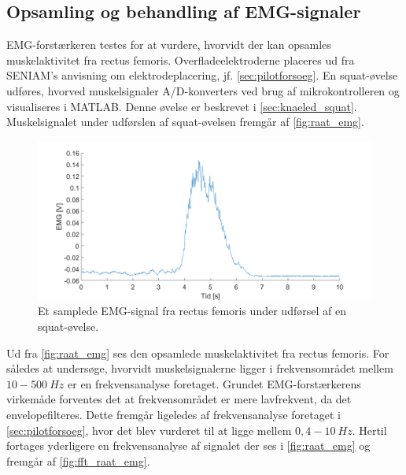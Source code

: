 \subsection{Opsamling og behandling af EMG-signaler}

EMG-forstærkeren testes for at vurdere, hvorvidt der kan opsamles muskelaktivitet fra rectus femoris. Overfladeelektroderne placeres ud fra SENIAM's anvisning om elektrodeplacering, jf. \autoref{sec:pilotforsoeg}. En squat-øvelse udføres, hvorved muskelsignaler A/D-konverters ved brug af mikrokontrolleren og visualiseres i MATLAB. Denne øvelse er beskrevet i \autoref{sec:knaeled_squat}. Muskelsignalet under udførslen af squat-øvelsen fremgår af \autoref{fig:raat_emg}. 

\begin{figure}[H]
\centering
\includegraphics[width=1\textwidth]{figures/raat_EMG_test}
\caption{Et samplede EMG-signal fra rectus femoris under udførsel af en squat-øvelse.}
\label{fig:raat_emg}
\end{figure}

\noindent
Ud fra \autoref{fig:raat_emg} ses den opsamlede muskelaktivitet fra rectus femoris. For således at undersøge, hvorvidt muskelsignalerne ligger i frekvensområdet mellem $10-500~Hz$ er en frekvensanalyse foretaget. Grundet EMG-forstærkerens virkemåde forventes det at frekvensområdet er mere lavfrekvent, da det envelopefilteres. Dette fremgår ligeledes af frekvensanalyse foretaget i \autoref{sec:pilotforsoeg}, hvor det blev vurderet til at ligge  mellem $0,4-10~Hz$. Hertil fortages yderligere en frekvensanalyse af signalet der ses i  \autoref{fig:raat_emg} og fremgår af \autoref{fig:fft_raat_emg}.

